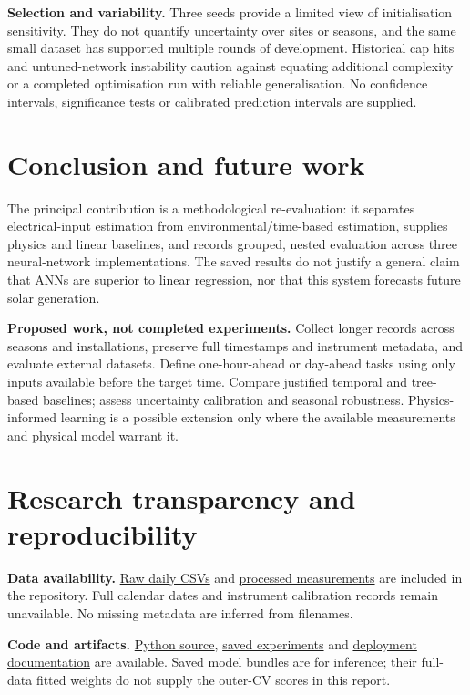 \documentclass[10pt,journal,twoside]{IEEEtran}
\begin{document}
\textbf{Selection and variability.} Three seeds provide a limited view of initialisation sensitivity.
They do not quantify uncertainty over sites or seasons, and the same small dataset has supported
multiple rounds of development. Historical cap hits and untuned-network instability caution against
equating additional complexity or a completed optimisation run with reliable generalisation.
No confidence intervals, significance tests or calibrated prediction intervals are supplied.


\section{Conclusion and future work}


The principal contribution is a methodological re-evaluation: it separates electrical-input
estimation from environmental/time-based estimation, supplies physics and linear baselines,
and records grouped, nested evaluation across three neural-network implementations. The
saved results do not justify a general claim that ANNs are superior to linear regression,
nor that this system forecasts future solar generation.

\textbf{Proposed work, not completed experiments.} Collect longer records across
seasons and installations, preserve full timestamps and instrument metadata, and evaluate
external datasets. Define one-hour-ahead or day-ahead tasks using only inputs available before
the target time. Compare justified temporal and tree-based baselines; assess uncertainty
calibration and seasonal robustness. Physics-informed learning is a possible extension only
where the available measurements and physical model warrant it.


\section{Research transparency and reproducibility}

\textbf{Data availability.} \href{https://github.com/OluwafisayoIbrahim/solar-power-prediction-python/tree/dev/data/raw}{Raw daily CSVs} and \href{https://github.com/OluwafisayoIbrahim/solar-power-prediction-python/tree/dev/data/processed/solar_data_combined.csv}{processed measurements} are included in the repository. Full calendar dates and instrument calibration records remain unavailable. No missing metadata are inferred from filenames.

\textbf{Code and artifacts.} \href{https://github.com/OluwafisayoIbrahim/solar-power-prediction-python/tree/dev/src}{Python source}, \href{https://github.com/OluwafisayoIbrahim/solar-power-prediction-python/tree/dev/results}{saved experiments} and \href{https://github.com/OluwafisayoIbrahim/solar-power-prediction-python/tree/dev/deployment/}{deployment documentation} are available. Saved model bundles are for inference; their full-data fitted weights do not supply the outer-CV scores in this report.
\end{document}
